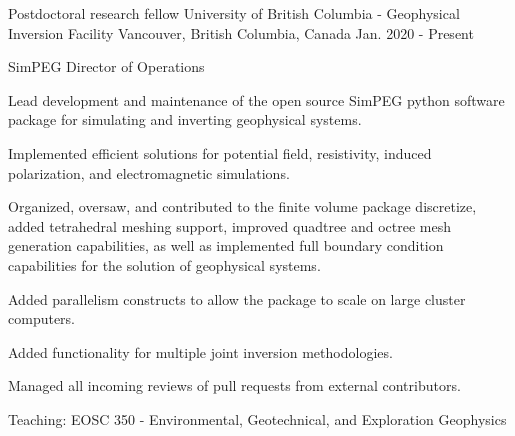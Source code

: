 

\begin{cventries}
\cventry
    {Postdoctoral research fellow} %
    {University of British Columbia - Geophysical Inversion Facility} %
    {Vancouver, British Columbia, Canada} %
    {Jan. 2020 - Present} %
    {\begin{cvparagraph}
      SimPEG Director of Operations
      \vspace{7pt}
      \end{cvparagraph}
      \begin{cvitems} %
        \item {Lead development and maintenance of the open source SimPEG python software package for simulating and inverting geophysical systems.}
        \item {Implemented efficient solutions for potential field, resistivity, induced polarization, and electromagnetic simulations.}
        \item {Organized, oversaw, and contributed to the finite volume package discretize, added tetrahedral meshing support, improved quadtree and octree mesh generation capabilities, as well as implemented full boundary condition capabilities for the solution of geophysical systems.}
        \item {Added parallelism constructs to allow the package to scale on large cluster computers.}
        \item {Added functionality for multiple joint inversion methodologies.}
        \item {Managed all incoming reviews of pull requests from external contributors.}
        \vspace{10pt}
      \end{cvitems}
      \begin{cvparagraph}
      \vspace{7pt}
      Teaching: EOSC 350 - Environmental, Geotechnical, and Exploration Geophysics
      \vspace{7pt}
      \end{cvparagraph}
      \begin{cvitems}

\end{cvitems}}
\end{cventries}
